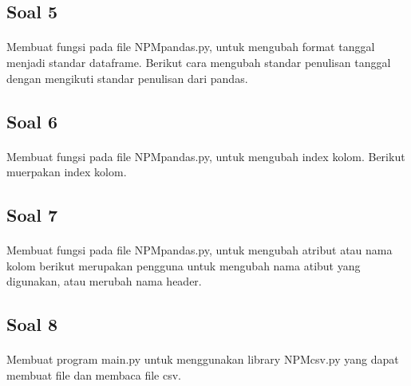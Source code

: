 \documentclass{article}
\begin{document}
    \subsection*{Soal 5}
        \paragraph{}Membuat fungsi pada file NPMpandas.py, untuk mengubah format tanggal menjadi standar dataframe. Berikut cara mengubah standar penulisan tanggal dengan mengikuti standar penulisan dari pandas.
        
    
    \subsection*{Soal 6}
        \paragraph{}Membuat fungsi pada file NPMpandas.py, untuk mengubah index kolom. Berikut muerpakan index kolom.
        
    
    \subsection*{Soal 7}
        \paragraph{}Membuat fungsi pada file NPMpandas.py, untuk mengubah atribut atau nama kolom berikut merupakan pengguna untuk mengubah nama atibut yang digunakan, atau merubah nama header.
        
        
    \subsection*{Soal 8}
        \paragraph{}Membuat program main.py untuk menggunakan library NPMcsv.py yang dapat membuat file dan membaca file csv.
        
        
\end{document}
